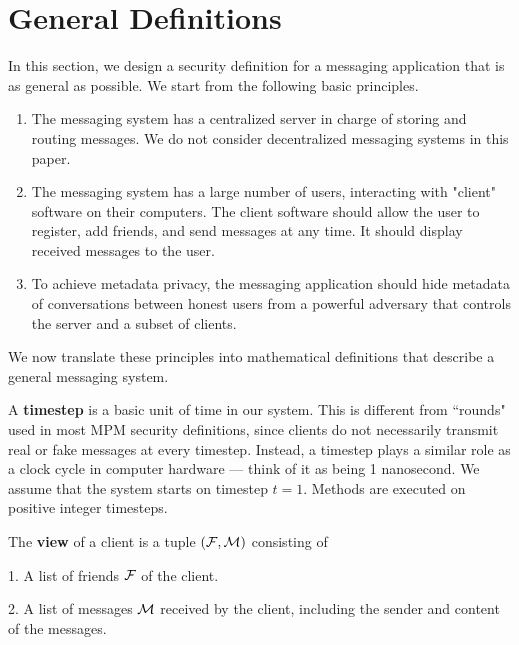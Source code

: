 \section{General Definitions}
\label{sec:general-defn}
In this section, we design a security definition for a messaging application that is as general as possible. We start from the following basic principles.
\begin{enumerate}
    \item The messaging system has a centralized server in charge of storing and routing messages. We do not consider decentralized messaging systems in this paper.
    \item The messaging system has a large number of users, interacting with "client" software on their computers. The client software should allow the user to register, add friends, and send messages at any time. It should display received messages to the user.
    \item To achieve metadata privacy, the messaging application should hide metadata of conversations between honest users from a powerful adversary that controls the server and a subset of clients. 
\end{enumerate}
We now translate these principles into mathematical definitions that describe a general messaging system.
\begin{definition}
\label{defn:messaging-timestep}
A \textbf{timestep} is a basic unit of time in our system. This is different from ``rounds" used in most MPM security definitions, since clients do not necessarily transmit real or fake messages at every timestep. Instead, a timestep plays a similar role as a clock cycle in computer hardware — think of it as being 1 nanosecond. We assume that the system starts on timestep $t = 1$. Methods are executed on positive integer timesteps.
\end{definition}
\begin{definition}
\label{defn:messaging-client-view}
The \textbf{view} of a client is a tuple $(\mathcal{F}, \mathcal{M})$ consisting of

1. A list of friends $\mathcal{F}$ of the client.

2. A list of messages $\mathcal{M}$ received by the client, including the sender and content of the messages.
\end{definition}
